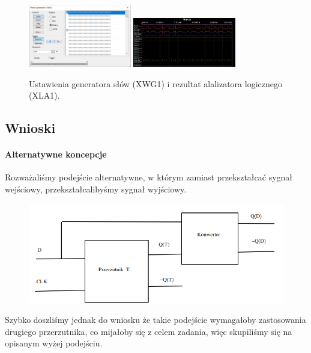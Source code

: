 \documentclass{article}
\begin{document}
\begin{figure}[H]
\caption{Ustawienia generatora słów (XWG1) i rezultat alalizatora logicznego (XLA1).}
\includegraphics[width = 0.4\textwidth]{2agen}
\includegraphics[width = 0.4\textwidth]{2aana}
\end{figure}
\newpage
\subsection{Wnioski}
\paragraph{Alternatywne koncepcje}
Rozważaliśmy podejście alternatywne, w którym zamiast przekształcać sygnał wejściowy, przekształcalibyśmy sygnał wyjściowy.
\begin{figure}[H]
\includegraphics[width = \textwidth]{2afail}
\end{figure}
 Szybko doszliśmy jednak do wniosku że takie podejście wymagałoby zastosowania drugiego przerzutnika, co mijałoby się z celem zadania, więc skupiliśmy się na opisanym wyżej podejściu.
\end{document}
